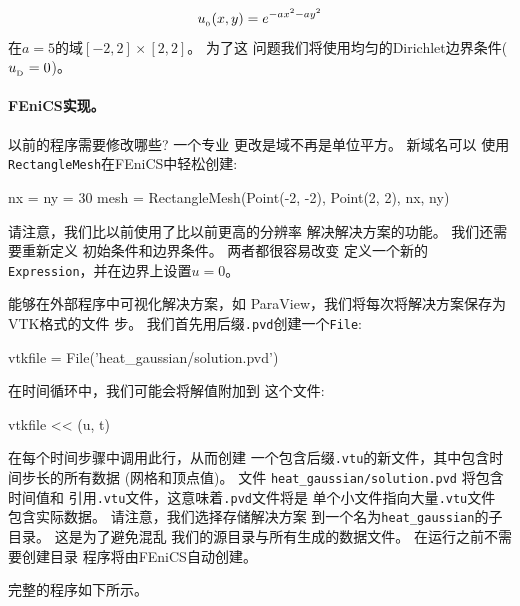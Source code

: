 \[ u_{_0}(x,y)= e^{-ax^2 - ay^2}\]
在$a = 5$的域$[-2,2]\times [2,2]$。 为了这
问题我们将使用均匀的Dirichlet边界条件($u_{_\mathrm{D}} = 0$)。

\paragraph{FEniCS实现。}
以前的程序需要修改哪些? 一个专业
更改是域不再是单位平方。 新域名可以
使用\texttt{RectangleMesh}在FEniCS中轻松创建:

\begin{python}
nx = ny = 30
mesh = RectangleMesh(Point(-2, -2), Point(2, 2), nx, ny)
\end{python}
请注意，我们比以前使用了比以前更高的分辨率
解决解决方案的功能。 我们还需要重新定义
初始条件和边界条件。 两者都很容易改变
定义一个新的\texttt{Expression}，并在边界上设置$u = 0$。

能够在外部程序中可视化解决方案，如
ParaView，我们将每次将解决方案保存为VTK格式的文件
步。 我们首先用后缀\texttt{.pvd}创建一个\texttt{File}:

\begin{python}
vtkfile = File('heat_gaussian/solution.pvd')
\end{python}
在时间循环中，我们可能会将解值附加到
这个文件:

\begin{python}
vtkfile << (u, t)
\end{python}
在每个时间步骤中调用此行，从而创建
一个包含后缀\texttt{.vtu}的新文件，其中包含时间步长的所有数据
(网格和顶点值)。 文件
\verb!heat_gaussian/solution.pvd! 将包含时间值和
引用\texttt{.vtu}文件，这意味着\texttt{.pvd}文件将是
单个小文件指向大量\texttt{.vtu}文件
包含实际数据。 请注意，我们选择存储解决方案
到一个名为\verb!heat_gaussian!的子目录。 这是为了避免混乱
我们的源目录与所有生成的数据文件。
在运行之前不需要创建目录
程序将由FEniCS自动创建。


完整的程序如下所示。

